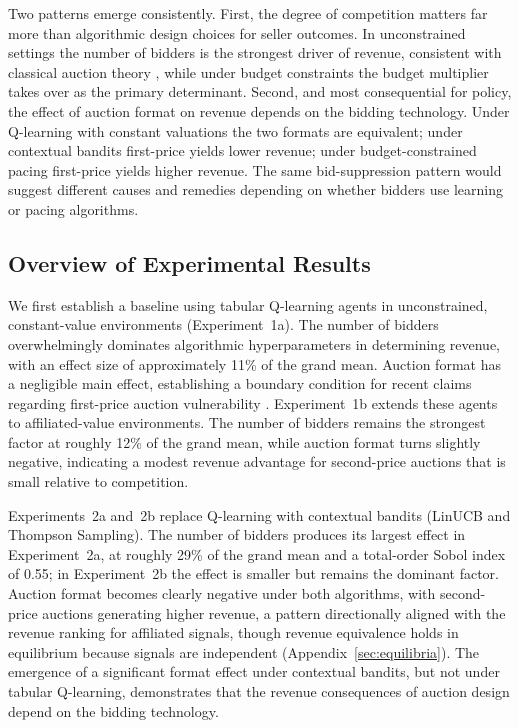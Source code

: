 Two patterns emerge consistently. First, the degree of competition matters far more than algorithmic design choices for seller outcomes. In unconstrained settings the number of bidders is the strongest driver of revenue, consistent with classical auction theory \citep{BulowKlemperer1996}, while under budget constraints the budget multiplier takes over as the primary determinant. Second, and most consequential for policy, the effect of auction format on revenue depends on the bidding technology. Under Q-learning with constant valuations the two formats are equivalent; under contextual bandits first-price yields lower revenue; under budget-constrained pacing first-price yields higher revenue. The same bid-suppression pattern would suggest different causes and remedies depending on whether bidders use learning or pacing algorithms.

\subsection{Overview of Experimental Results}

We first establish a baseline using tabular Q-learning agents in unconstrained, constant-value environments (Experiment~1a). The number of bidders overwhelmingly dominates algorithmic hyperparameters in determining revenue, with an effect size of approximately 11\% of the grand mean. Auction format has a negligible main effect, establishing a boundary condition for recent claims regarding first-price auction vulnerability \citep{BanchioSkrzypacz2022}. Experiment~1b extends these agents to affiliated-value environments. The number of bidders remains the strongest factor at roughly 12\% of the grand mean, while auction format turns slightly negative, indicating a modest revenue advantage for second-price auctions that is small relative to competition.

Experiments~2a and~2b replace Q-learning with contextual bandits (LinUCB and Thompson Sampling). The number of bidders produces its largest effect in Experiment~2a, at roughly 29\% of the grand mean and a total-order Sobol index of 0.55; in Experiment~2b the effect is smaller but remains the dominant factor. Auction format becomes clearly negative under both algorithms, with second-price auctions generating higher revenue, a pattern directionally aligned with the \citet{MilgromWeber1982} revenue ranking for affiliated signals, though revenue equivalence holds in equilibrium because signals are independent (Appendix~\ref{sec:equilibria}). The emergence of a significant format effect under contextual bandits, but not under tabular Q-learning, demonstrates that the revenue consequences of auction design depend on the bidding technology.

